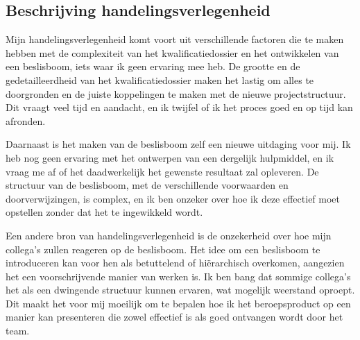 \subsection{Beschrijving handelingsverlegenheid}
Mijn handelingsverlegenheid komt voort uit verschillende factoren die te maken hebben met de complexiteit van het kwalificatiedossier en het ontwikkelen van een beslisboom, iets waar ik geen ervaring mee heb. De grootte en de gedetailleerdheid van het kwalificatiedossier maken het lastig om alles te doorgronden en de juiste koppelingen te maken met de nieuwe projectstructuur. Dit vraagt veel tijd en aandacht, en ik twijfel of ik het proces goed en op tijd kan afronden.


Daarnaast is het maken van de beslisboom zelf een nieuwe uitdaging voor mij. Ik heb nog geen ervaring met het ontwerpen van een dergelijk hulpmiddel, en ik vraag me af of het daadwerkelijk het gewenste resultaat zal opleveren. De structuur van de beslisboom, met de verschillende voorwaarden en doorverwijzingen, is complex, en ik ben onzeker over hoe ik deze effectief moet opstellen zonder dat het te ingewikkeld wordt.

Een andere bron van handelingsverlegenheid is de onzekerheid over hoe mijn collega's
 zullen reageren op de beslisboom. Het idee om een beslisboom te introduceren kan voor hen als betuttelend of hiërarchisch overkomen, aangezien het een voorschrijvende manier van werken is. Ik ben bang dat sommige collega's
 het als een dwingende structuur kunnen ervaren, wat mogelijk weerstand oproept. Dit maakt het voor mij moeilijk om te bepalen hoe ik het beroepsproduct op een manier kan presenteren die zowel effectief is als goed ontvangen wordt door het team.

